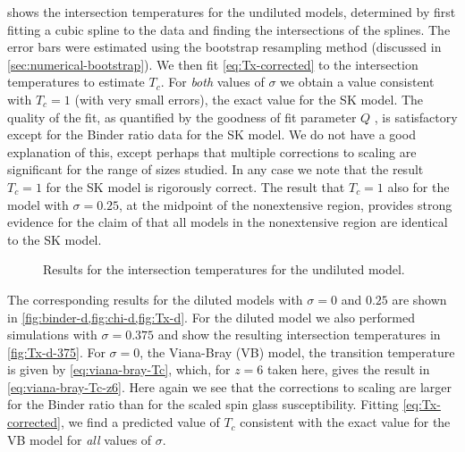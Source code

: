  shows the intersection temperatures for the undiluted models,
determined by first fitting a cubic spline to the data and finding the
intersections of the splines. The error bars were estimated using the bootstrap
resampling method (discussed in \cref{sec:numerical-bootstrap}). We then fit
\cref{eq:Tx-corrected} to the intersection temperatures to estimate $T_c$. For
\emph{both} values of $\sigma$ we obtain a value consistent with $T_c=1$ (with
very small errors), the exact value for the SK model. The quality of the fit,
as quantified by the goodness of fit parameter $Q$
\autocite{press2007numerical}, is satisfactory except for the Binder ratio data
for the SK model. We do not have a good explanation of this, except perhaps
that multiple corrections to scaling are significant for the range of sizes
studied. In any case we note that the result $T_c=1$ for the SK model is
rigorously correct. The result that $T_c=1$ also for the model with
$\sigma=0.25$, at the midpoint of the nonextensive region, provides strong
evidence for the claim of \textcite{mori2011instability} that all models in the
nonextensive region are identical to the SK model.

\begin{figure}
  \centering
  \begin{subfigure}{0.49\textwidth}
    \centering
    
  \end{subfigure}
  \begin{subfigure}{0.49\textwidth}
    \centering
    
  \end{subfigure}
  \caption[
    Results for the intersection temperatures for the 1-d undilted model
    with $\sigma=0$ (SK model) and $\sigma=0.25$.
  ]
  {
    Results for the intersection temperatures for the undiluted model.
  }
  \label{fig:Tx-c}
\end{figure}

The corresponding results for the diluted models with $\sigma=0$ and $0.25$ are
shown in \cref{fig:binder-d,fig:chi-d,fig:Tx-d}. For the diluted model we also
performed simulations with $\sigma=0.375$ and show the resulting intersection
temperatures in \cref{fig:Tx-d-375}. For $\sigma=0$, the Viana-Bray (VB) model,
the transition temperature is given by \cref{eq:viana-bray-Tc}, which, for
$z=6$ taken here, gives the result in \cref{eq:viana-bray-Tc-z6}. Here again we
see that the corrections to scaling are larger for the Binder ratio than for
the scaled spin glass susceptibility. Fitting \cref{eq:Tx-corrected}, we find a
predicted value of $T_c$ consistent with the exact value for the VB model for
\emph{all} values of $\sigma$.

